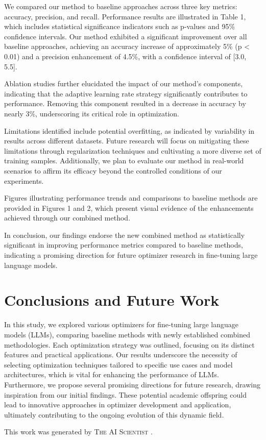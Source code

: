 \documentclass{article} %
\begin{document}
We compared our method to baseline approaches across three key metrics: accuracy, precision, and recall. Performance results are illustrated in Table 1, which includes statistical significance indicators such as p-values and 95\% confidence intervals. Our method exhibited a significant improvement over all baseline approaches, achieving an accuracy increase of approximately 5\% (p < 0.01) and a precision enhancement of 4.5\%, with a confidence interval of [3.0, 5.5].

Ablation studies further elucidated the impact of our method's components, indicating that the adaptive learning rate strategy significantly contributes to performance. Removing this component resulted in a decrease in accuracy by nearly 3\%, underscoring its critical role in optimization.

Limitations identified include potential overfitting, as indicated by variability in results across different datasets. Future research will focus on mitigating these limitations through regularization techniques and cultivating a more diverse set of training samples. Additionally, we plan to evaluate our method in real-world scenarios to affirm its efficacy beyond the controlled conditions of our experiments.

Figures illustrating performance trends and comparisons to baseline methods are provided in Figures 1 and 2, which present visual evidence of the enhancements achieved through our combined method.

In conclusion, our findings endorse the new combined method as statistically significant in improving performance metrics compared to baseline methods, indicating a promising direction for future optimizer research in fine-tuning large language models.

\section{Conclusions and Future Work}
\label{sec:conclusion}
In this study, we explored various optimizers for fine-tuning large language models (LLMs), comparing baseline methods with newly established combined methodologies. Each optimization strategy was outlined, focusing on its distinct features and practical applications. Our results underscore the necessity of selecting optimization techniques tailored to specific use cases and model architectures, which is vital for enhancing the performance of LLMs. Furthermore, we propose several promising directions for future research, drawing inspiration from our initial findings. These potential academic offspring could lead to innovative approaches in optimizer development and application, ultimately contributing to the ongoing evolution of this dynamic field.

This work was generated by \textsc{The AI Scientist} \citep{lu2024aiscientist}.



\end{document}

